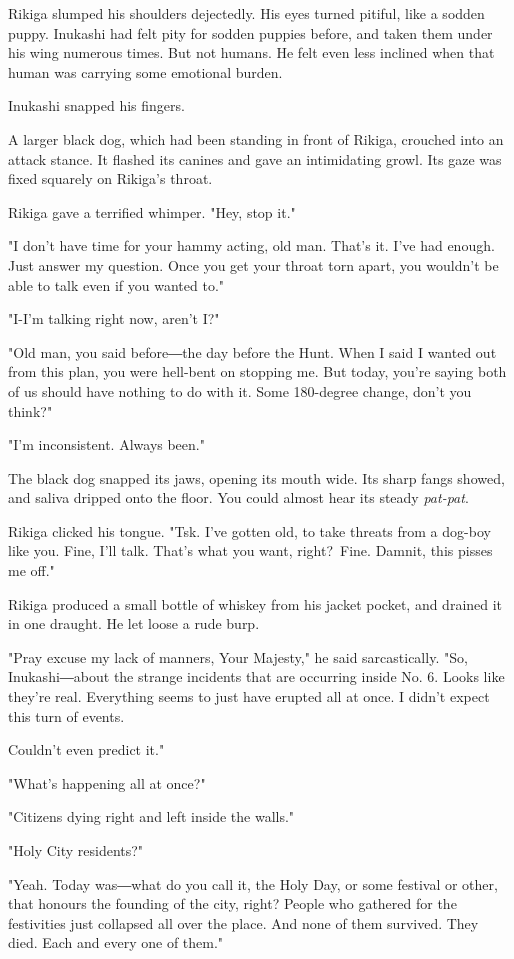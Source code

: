 Rikiga slumped his shoulders dejectedly. His eyes turned pitiful, like a
sodden puppy. Inukashi had felt pity for sodden puppies before, and
taken them under his wing numerous times. But not humans. He felt even
less inclined when that human was carrying some emotional burden.

Inukashi snapped his fingers.

A larger black dog, which had been standing in front of Rikiga, crouched
into an attack stance. It flashed its canines and gave an intimidating
growl. Its gaze was fixed squarely on Rikiga's throat.

Rikiga gave a terrified whimper. "Hey, stop it."

"I don't have time for your hammy acting, old man. That's it. I've had
enough. Just answer my question. Once you get your throat torn apart,
you wouldn't be able to talk even if you wanted to."

"I-I'm talking right now, aren't I?"

"Old man, you said before―the day before the Hunt. When I said I wanted
out from this plan, you were hell-bent on stopping me. But today, you're
saying both of us should have nothing to do with it. Some 180-degree
change, don't you think?"

"I'm inconsistent. Always been."

The black dog snapped its jaws, opening its mouth wide. Its sharp fangs
showed, and saliva dripped onto the floor. You could almost hear its
steady \emph{pat-pat}.

Rikiga clicked his tongue. "Tsk. I've gotten old, to take threats from a
dog-boy like you. Fine, I'll talk. That's what you want, right?~Fine.
Damnit, this pisses me off."

Rikiga produced a small bottle of whiskey from his jacket pocket, and
drained it in one draught. He let loose a rude burp.

"Pray excuse my lack of manners, Your Majesty," he said sarcastically.
"So, Inukashi―about the strange incidents that are occurring inside No.
6. Looks like they're real. Everything seems to just have erupted all at
once. I didn't expect this turn of events.~

Couldn't even predict it."

"What's happening all at once?"

"Citizens dying right and left inside the walls."

"Holy City residents?"

"Yeah. Today was―what do you call it, the Holy Day, or some festival or
other, that honours the founding of the city, right? People who gathered
for the festivities just collapsed all over the place. And none of them
survived. They died. Each and every one of them."

